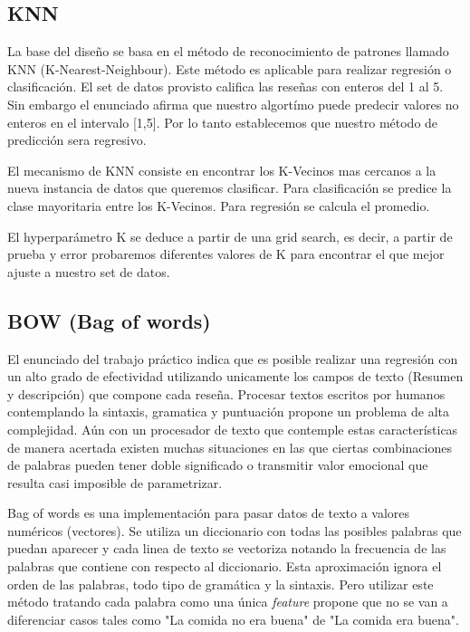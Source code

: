 \documentclass[a4paper,10pt]{article}
\begin{document}
	\subsection{KNN}
	La base del dise\~{n}o se basa en el m\'{e}todo de reconocimiento de patrones llamado KNN (K-Nearest-Neighbour). Este m\'{e}todo es aplicable para realizar regresi\'{o}n o clasificaci\'{o}n. El set de datos provisto califica las rese\~{n}as con enteros del 1 al 5. Sin embargo el enunciado afirma que nuestro algort\'{i}mo puede predecir valores no enteros en el intervalo [1,5]. Por lo tanto establecemos que nuestro m\'{e}todo de predicci\'{o}n sera regresivo.
	
	El mecanismo de KNN consiste en encontrar los K-Vecinos mas cercanos a la nueva instancia de datos que queremos clasificar. Para clasificaci\'{o}n se predice la clase mayoritaria entre los K-Vecinos. Para regresi\'{o}n se calcula el promedio.
	
	El hyperpar\'{a}metro K se deduce a partir de una grid search, es decir, a partir de prueba y error probaremos diferentes valores de K para encontrar el que mejor ajuste a nuestro set de datos.
	

	\subsection{BOW (Bag of words)}
	El enunciado del trabajo pr\'{a}ctico indica que es posible realizar una regresi\'{o}n con un alto grado de efectividad utilizando unicamente los campos de texto (Resumen y descripci\'{o}n) que compone cada rese\~{n}a. Procesar textos escritos por humanos contemplando la sintaxis, gramatica y puntuaci\'{o}n propone un problema de alta complejidad. A\'{u}n con un procesador de texto que contemple estas caracter\'{i}sticas de manera acertada existen muchas situaciones en las que ciertas combinaciones de palabras pueden tener doble significado o transmitir valor emocional que resulta casi imposible de parametrizar.
	
	Bag of words es una implementaci\'{o}n para pasar datos de texto a valores num\'{e}ricos (vectores). Se utiliza un diccionario con todas las posibles palabras que puedan aparecer y cada linea de texto se vectoriza notando la frecuencia de las palabras que contiene con respecto al diccionario. Esta aproximaci\'{o}n ignora el orden de las palabras, todo tipo de gram\'{a}tica y la sintaxis. Pero utilizar este m\'{e}todo tratando cada palabra como una \'{u}nica \textit{feature} propone que no se van a diferenciar casos tales como "La comida no era buena" de "La comida era buena".
	
\end{document}
